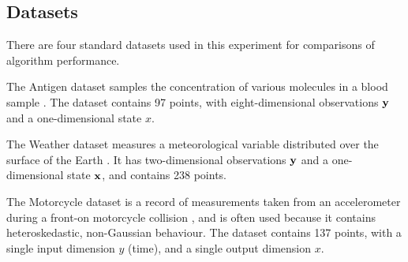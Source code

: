 \documentclass[twoside]{article} \usepackage{aistats2017}
\theoremstyle{definition}
\theoremstyle{theorem}
\begin{document}
						
	\subsection{Datasets}
	\label{sec:experiments:datasets}
	
		There are four standard datasets used in this experiment for comparisons of algorithm performance.
		
		The Antigen dataset samples the concentration of various molecules in a blood sample \citep{quadrianto2009kernel, lichman2013uci}. The dataset contains 97 points, with eight-dimensional observations $\mathbf{y}$ and a one-dimensional state $x$.
		
		The Weather dataset measures a meteorological variable distributed over the surface of the Earth \citep{lichman2013uci}. It has two-dimensional observations $\mathbf{y}$ and a one-dimensional state $\mathbf{x}$, and contains 238 points.
		
		The Motorcycle dataset is a record of measurements taken from an accelerometer during a front-on motorcycle collision \citep{lichman2013uci}, and is often used because it contains heteroskedastic, non-Gaussian behaviour. The dataset contains 137 points, with a single input dimension $y$ (time), and a single output dimension $x$.
		
\end{document}
